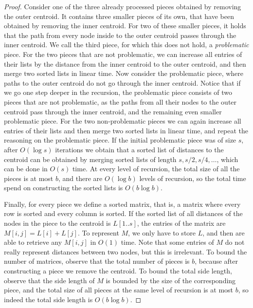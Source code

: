 \documentclass[11pt,a4paper]{article}
\theoremstyle{definition}
\theoremstyle{remark}
\begin{document}
\begin{proof}
Consider one of the three already processed pieces obtained by removing the outer centroid. It contains three smaller pieces of its own,
that have been obtained by removing the inner centroid.
For two of these smaller pieces, it holds that the path from every node inside to the outer centroid passes through the inner centroid.
We call the third piece, for which this does not hold, a \textit{problematic} piece. For the two pieces that are not problematic, we can 
increase all entries of their lists by the distance from the inner centroid to the outer centroid, and then merge two sorted lists in linear time.
Now consider the problematic piece, where paths to the outer centroid do not go through the inner centroid. Notice that if we go one step deeper
in the recursion, the problematic piece consists of two pieces that are not problematic, as the paths from all their nodes to the outer centroid
pass through the inner centroid, and the remaining even smaller problematic piece. For the two non-problematic pieces we can again
increase all entries of their lists and then merge two sorted lists in linear time, and repeat the reasoning on the problematic piece.
If the initial problematic piece was of size $s$, after $O(\log s)$ iterations we obtain that a sorted list of distances to the centroid can be
obtained by merging sorted lists of length $s,s/2,s/4,\ldots$, which can be done in $O(s)$ time. At every level of recursion, 
the total size of all the pieces is at most $b$, and there are $O(\log b)$ levels of recursion, so the total time spend on constructing
the sorted lists is $O(b\log b)$.

Finally, for every piece we define a sorted matrix, that is, a matrix where every row is sorted and every column is sorted. If the sorted list of all distances of the nodes in the piece to the
centroid is $L[1..s]$, the entries of the matrix are $M[i,j]=L[i]+L[j]$. To represent $M$, we only have to store $L$, and then are able to
retrieve any $M[i,j]$ in $O(1)$ time. Note that some entries of $M$ do not really represent distances between two nodes, but this is irrelevant.
To bound the number of matrices, observe that the total number of pieces is $b$, because after constructing a piece we remove the centroid.
To bound the total side length, observe that the side length of $M$ is bounded by the size of the corresponding piece, and the total size
of all pieces at the same level of recursion is at most $b$, so indeed the total side length is $O(b\log b)$.
\end{proof}
\end{document}
